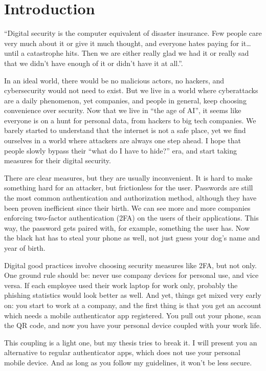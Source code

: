 \chapter{Introduction}

``Digital security is the computer equivalent of disaster insurance.
Few people care very much about it or give it much thought, and everyone hates paying for it… until a catastrophe hits.
Then we are either really glad we had it or really sad that we didn't have enough of it or didn't have it at all.''\cite{tpmbook}.

In an ideal world, there would be no malicious actors, no hackers, and cybersecurity would not need to exist.
But we live in a world where cyberattacks are a daily phenomenon, yet companies, and people in general, keep choosing convenience over security.
Now that we live in ``the age of AI'', it seems like everyone is on a hunt for personal data, from hackers to big tech companies.
We barely started to understand that the internet is not a safe place, yet we find ourselves in a world where attackers are always one step ahead.
I hope that people slowly bypass their ``what do I have to hide?'' era, and start taking measures for their digital security.

There are clear measures, but they are usually inconvenient.
It is hard to make something hard for an attacker, but frictionless for the user.
Passwords are still the most common authentication and authorization method, although they have been proven inefficient since their birth.
We can see more and more companies enforcing two-factor authentication (2FA) on the users of their applications.
This way, the password gets paired with, for example, something the user has.
Now the black hat has to steal your phone as well, not just guess your dog's name and year of birth.

Digital good practices involve choosing security measures like 2FA, but not only.
One ground rule should be: never use company devices for personal use, and vice versa.
If each employee used their work laptop for work only, probably the phishing statistics would look better as well.
And yet, things get mixed very early on: you start to work at a company, and the first thing is that you get an account which needs a mobile authenticator app registered.
You pull out your phone, scan the QR code, and now you have your personal device coupled with your work life.

This coupling is a light one, but my thesis tries to break it.
I will present you an alternative to regular authenticator apps, which does not use your personal mobile device.
And as long as you follow my guidelines, it won't be less secure.
